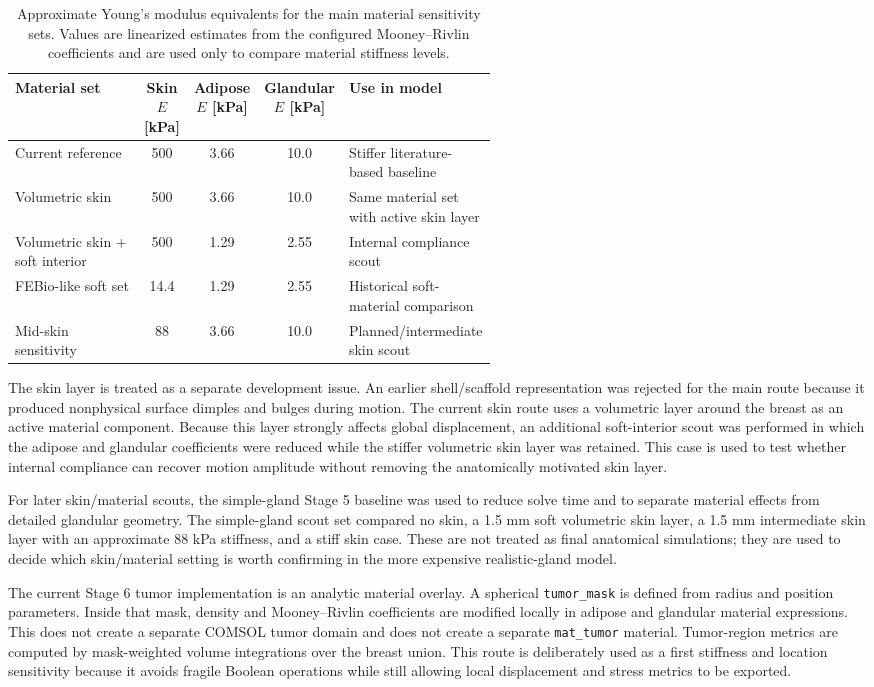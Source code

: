 \begin{table}[H]
\centering
\caption{Approximate Young's modulus equivalents for the main material sensitivity sets. Values are linearized estimates from the configured Mooney--Rivlin coefficients and are used only to compare material stiffness levels.}
\label{tab:mm_material_sets}
\begin{tabular}{p{0.29\linewidth}ccc p{0.27\linewidth}}
\toprule
Material set & Skin \(E\) [kPa] & Adipose \(E\) [kPa] & Glandular \(E\) [kPa] & Use in model \\
\midrule
Current reference & 500 & 3.66 & 10.0 & Stiffer literature-based baseline \\
Volumetric skin & 500 & 3.66 & 10.0 & Same material set with active skin layer \\
Volumetric skin + soft interior & 500 & 1.29 & 2.55 & Internal compliance scout \\
FEBio-like soft set & 14.4 & 1.29 & 2.55 & Historical soft-material comparison \\
Mid-skin sensitivity & 88 & 3.66 & 10.0 & Planned/intermediate skin scout \\
\bottomrule
\end{tabular}
\end{table}

The skin layer is treated as a separate development issue. An earlier shell/scaffold representation was rejected for the main route because it produced nonphysical surface dimples and bulges during motion. The current skin route uses a volumetric layer around the breast as an active material component. Because this layer strongly affects global displacement, an additional soft-interior scout was performed in which the adipose and glandular coefficients were reduced while the stiffer volumetric skin layer was retained. This case is used to test whether internal compliance can recover motion amplitude without removing the anatomically motivated skin layer.

For later skin/material scouts, the simple-gland Stage 5 baseline was used to reduce solve time and to separate material effects from detailed glandular geometry. The simple-gland scout set compared no skin, a 1.5 mm soft volumetric skin layer, a 1.5 mm intermediate skin layer with an approximate 88 kPa stiffness, and a stiff skin case. These are not treated as final anatomical simulations; they are used to decide which skin/material setting is worth confirming in the more expensive realistic-gland model.

The current Stage 6 tumor implementation is an analytic material overlay. A spherical \texttt{tumor\_mask} is defined from radius and position parameters. Inside that mask, density and Mooney--Rivlin coefficients are modified locally in adipose and glandular material expressions. This does not create a separate COMSOL tumor domain and does not create a separate \texttt{mat\_tumor} material. Tumor-region metrics are computed by mask-weighted volume integrations over the breast union. This route is deliberately used as a first stiffness and location sensitivity because it avoids fragile Boolean operations while still allowing local displacement and stress metrics to be exported.

